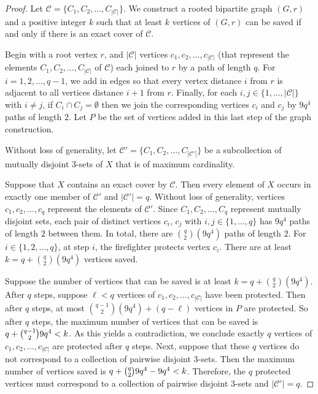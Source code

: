 \documentclass[12pt]{article}
\newcommand{\me}[1]{{\textcolor{blue}{ [\textbf{M.E..:}}\  \textcolor{blue}{{\em #1}]}}}
\begin{document}
\begin{proof}
Let $\mathcal{C} = \{C_1,C_2,\dots,C_{|\mathcal{C}|}\}$.  We construct a rooted bipartite graph $(G,r)$ and a positive integer $k$ such that at least $k$ vertices of $(G,r)$ can be saved if and only if there is an exact cover of $\mathcal{C}$.  

Begin with a root vertex $r$, and $|\mathcal{C}|$ vertices $c_1,c_2,\dots,c_{|\mathcal{C}|}$ (that represent the elements $C_1,C_2,\dots, C_{|\mathcal{C}|}$ of $\mathcal{C}$) each joined to $r$ by a path of length $q$.  For $i=1,2,\dots,q-1$, we add in edges so that every vertex distance $i$ from $r$ is adjacent to all vertices distance $i+1$ from $r$.  Finally, for each $i,j \in \{1,\dots,|\mathcal{C}|\}$ with $i \neq j$,  if $C_i \cap C_j = \emptyset$ then we join the corresponding vertices $c_i$ and $c_j$ by $9q^4$ paths of length $2$.  Let $P$ be the set of vertices added in this last step of the graph construction.

Without loss of generality, let $\mathcal{C}' = \{C_1,C_2,\dots,C_{|\mathcal{C}'|}\}$ be a subcollection of mutually disjoint $3$-sets of $X$ that is of maximum cardinality.


Suppose that $X$ contains an exact cover by $\mathcal{C}$.   Then every element of $X$ occurs in exactly one member of $\mathcal{C}'$ and $|\mathcal{C}'|=q$.  Without loss of generality, vertices $c_1,c_2,\dots,c_q$ represent the elements of $\mathcal{C}'$.  Since $C_1,C_2,\dots,C_q$ represent mutually disjoint sets, each pair of distinct vertices $c_i$, $c_j$ with $i,j \in \{1,\dots, q\}$ has $9q^4$ paths of length $2$ between them.  In total, there are $\binom{q}{2}(9q^4)$ paths of length $2$.  For $i \in \{1,2,\dots,q\}$, at step $i$, the firefighter protects vertex $c_i$.  There are at least $k=q+\binom{q}{2}(9q^4)$ vertices saved.

Suppose the number of vertices that can be saved is at least $k = q + {q \choose 2}(9q^4)$.  After $q$ steps, suppose $\ell < q$ vertices of $c_1,c_2,\dots,c_{|\mathcal{C}|}$ have been protected.  Then after $q$ steps, at most ${q-1 \choose 2} (9q^4) + (q-\ell)$ vertices in $P$ are protected.  So after $q$ steps, the maximum number of vertices that can be saved is $q+\tbinom{q-1}{2}9q^4 < k$.  As this yields a contradiction, we conclude exactly $q$ vertices of $c_1,c_2,\dots,c_{|\mathcal{C}|}$ are protected after $q$ steps.  Next, suppose that these $q$ vertices do not correspond to a collection of pairwise disjoint $3$-sets.  Then the maximum number of vertices saved is $q+\tbinom{q}{2} 9q^4 - 9q^4 < k$.  Therefore, the $q$ protected vertices must correspond to a collection of pairwise disjoint $3$-sets and $|\mathcal{C}'|=q$.\end{proof} 
\end{document}
